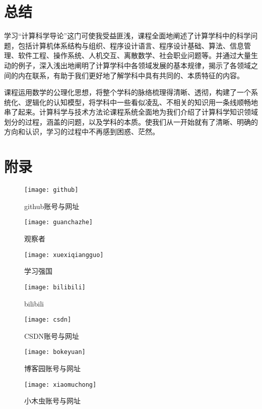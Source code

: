 \documentclass{article}
\begin{document}
\section{总结}
学习“计算科学导论”这门可使我受益匪浅，课程全面地阐述了计算学科中的科学问题，包括计算机体系结构与组织、程序设计语言、程序设计基础、算法、信息管理、软件工程、操作系统、人机交互、离散数学、社会职业问题等。并通过大量生动的例子，深入浅出地阐明了计算学科中各领域发展的基本规律，揭示了各领域之间的内在联系，有助于我们更好地了解学科中具有共同的、本质特征的内容。\par
课程运用数学的公理化思想，将整个学科的脉络梳理得清晰、透彻，构建了一个系统化、逻辑化的认知模型，将学科中一些看似凌乱、不相关的知识用一条线顺畅地串了起来。计算科学与技术方法论课程系统全面地为我们介绍了计算科学知识领域划分的过程，涵盖的问题，以及学科的本质。使我们从一开始就有了清晰、明确的方向和认识，学习的过程中不再感到困惑、茫然。\par


\section{附录}
\begin{figure}[H]
	\centering
	\texttt{[image: github]}
	\caption{github账号与网址}
	\label{fig:github}
\end{figure}
	\begin{figure}[H]
		\centering
		\texttt{[image: guanchazhe]}
		\caption{观察者}
		\label{fig:guanchazhe}
	\end{figure}
\begin{figure}[H]
	\centering
	\texttt{[image: xuexiqiangguo]}
	\caption{学习强国}
	\label{fig:xuexiqiangguo}
\end{figure}
\begin{figure}[H]
	\centering
	\texttt{[image: bilibili]}
	\caption{bilibili}
	\label{fig:bilibili}
\end{figure}
\begin{figure}[H]
	\centering
	\texttt{[image: csdn]}
	\caption{CSDN账号与网址}
	\label{fig:csdn}
\end{figure}
\begin{figure}[H]
	\centering
	\texttt{[image: bokeyuan]}
	\caption{博客园账号与网址}
	\label{fig:bokeyuan}
\end{figure}
\begin{figure}[H]
	\centering
	\texttt{[image: xiaomuchong]}
	\caption{小木虫账号与网址}
	\label{fig:xiaomuchong}
\end{figure}



\hspace*{\fill} \\


\end{document}
